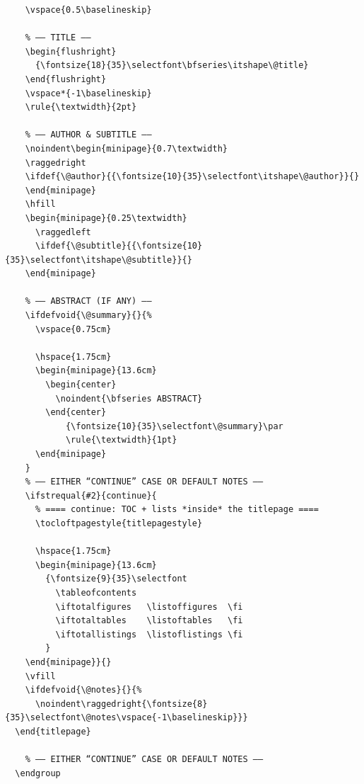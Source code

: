 \documentclass[english]{reporti}
\begin{document}
\begin{verbatim}
    \vspace{0.5\baselineskip} 

    % —– TITLE —–
    \begin{flushright}
      {\fontsize{18}{35}\selectfont\bfseries\itshape\@title}
    \end{flushright}
    \vspace*{-1\baselineskip} 
    \rule{\textwidth}{2pt}

    % —– AUTHOR & SUBTITLE —–
    \noindent\begin{minipage}{0.7\textwidth}
    \raggedright
    \ifdef{\@author}{{\fontsize{10}{35}\selectfont\itshape\@author}}{}
    \end{minipage}
    \hfill
    \begin{minipage}{0.25\textwidth}
      \raggedleft
      \ifdef{\@subtitle}{{\fontsize{10}{35}\selectfont\itshape\@subtitle}}{}
    \end{minipage}

    % —– ABSTRACT (IF ANY) —–
    \ifdefvoid{\@summary}{}{%
      \vspace{0.75cm}
      
      \hspace{1.75cm}
      \begin{minipage}{13.6cm}
        \begin{center}
          \noindent{\bfseries ABSTRACT}
        \end{center}
            {\fontsize{10}{35}\selectfont\@summary}\par
            \rule{\textwidth}{1pt}
      \end{minipage}
    }
    % —– EITHER “CONTINUE” CASE OR DEFAULT NOTES —–
    \ifstrequal{#2}{continue}{
      % ==== continue: TOC + lists *inside* the titlepage ====
      \tocloftpagestyle{titlepagestyle}
      
      \hspace{1.75cm}
      \begin{minipage}{13.6cm}
        {\fontsize{9}{35}\selectfont
          \tableofcontents
          \iftotalfigures   \listoffigures  \fi
          \iftotaltables    \listoftables   \fi
          \iftotallistings  \listoflistings \fi
        }
    \end{minipage}}{}
    \vfill
    \ifdefvoid{\@notes}{}{%
      \noindent\raggedright{\fontsize{8}{35}\selectfont\@notes\vspace{-1\baselineskip}}}
  \end{titlepage}

    % —– EITHER “CONTINUE” CASE OR DEFAULT NOTES —–
  \endgroup
  

\end{verbatim}
\end{document}
